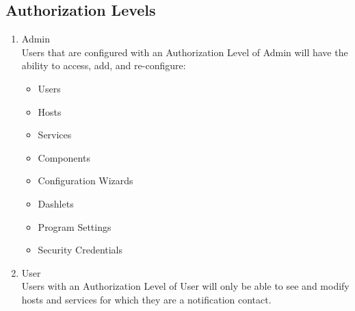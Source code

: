 \subsection{Authorization Levels}
\begin{enumerate}
\item Admin \\
Users that are configured with an Authorization Level of Admin will have the ability to access, add, and re-configure:
\begin{itemize}
\item Users
\item Hosts
\item Services
\item Components
\item Configuration Wizards
\item Dashlets
\item Program Settings
\item Security Credentials
\end{itemize}
\item User
\\
Users with an Authorization Level of User will only be able to see and modify hosts and services for which they are a notification contact.
\end{enumerate}
